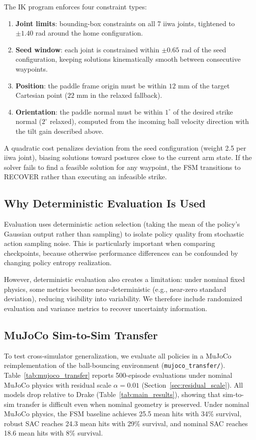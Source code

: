 \documentclass[10pt,twocolumn,letterpaper]{article}
\begin{document}
The IK program enforces four constraint types:
\begin{enumerate}[leftmargin=*,noitemsep]
    \item \textbf{Joint limits}: bounding-box constraints on all 7 iiwa joints, tightened to $\pm 1.40$ rad around the home configuration.
    \item \textbf{Seed window}: each joint is constrained within $\pm 0.65$ rad of the seed configuration, keeping solutions kinematically smooth between consecutive waypoints.
    \item \textbf{Position}: the paddle frame origin must be within $12$ mm of the target Cartesian point ($22$ mm in the relaxed fallback).
    \item \textbf{Orientation}: the paddle normal must be within $1^\circ$ of the desired strike normal ($2^\circ$ relaxed), computed from the incoming ball velocity direction with the tilt gain described above.
\end{enumerate}
A quadratic cost penalizes deviation from the seed configuration (weight 2.5 per iiwa joint), biasing solutions toward postures close to the current arm state. If the solver fails to find a feasible solution for any waypoint, the FSM transitions to RECOVER rather than executing an infeasible strike.

\subsection{Why Deterministic Evaluation Is Used}
Evaluation uses deterministic action selection (taking the mean of the policy's Gaussian output rather than sampling) to isolate policy quality from stochastic action sampling noise. This is particularly important when comparing checkpoints, because otherwise performance differences can be confounded by changing policy entropy realization.

However, deterministic evaluation also creates a limitation: under nominal fixed physics, some metrics become near-deterministic (e.g., near-zero standard deviation), reducing visibility into variability. We therefore include randomized evaluation and variance metrics to recover uncertainty information.

\subsection{MuJoCo Sim-to-Sim Transfer}
To test cross-simulator generalization, we evaluate all policies in a MuJoCo reimplementation of the ball-bouncing environment (\texttt{mujoco\_transfer/}). Table~\ref{tab:mujoco_transfer} reports 500-episode evaluations under nominal MuJoCo physics with residual scale $\alpha = 0.01$ (Section~\ref{sec:residual_scale}). All models drop relative to Drake (Table~\ref{tab:main_results}), showing that sim-to-sim transfer is difficult even when nominal geometry is preserved. Under nominal MuJoCo physics, the FSM baseline achieves 25.5 mean hits with 34\% survival, robust SAC reaches 24.3 mean hits with 29\% survival, and nominal SAC reaches 18.6 mean hits with 8\% survival.
\end{document}
